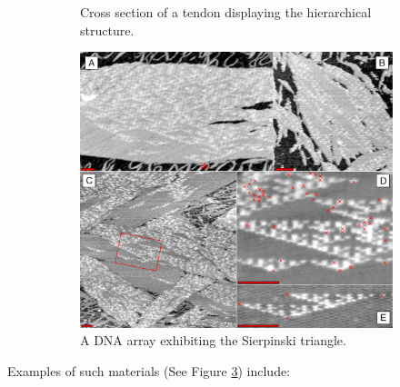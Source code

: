 \begin{figure}
\begin{subfigure}{.40\linewidth}
  \caption{Cross section of a tendon displaying the hierarchical structure.}
  \label{fig:material_examples:tendon}
\end{subfigure}\hfill
\begin{subfigure}{.30\linewidth}\centering
  \includegraphics[width=\linewidth]{img/Rothemund-DNA-SierpinskiGasket}
  \caption{A DNA array exhibiting the Sierpinski triangle.}
  \label{fig:material_examples:sierpinski}
\end{subfigure}
\caption{}\label{fig:material_examples}
\end{figure}


Examples of such materials (See Figure \ref{fig:material_examples})
include:

